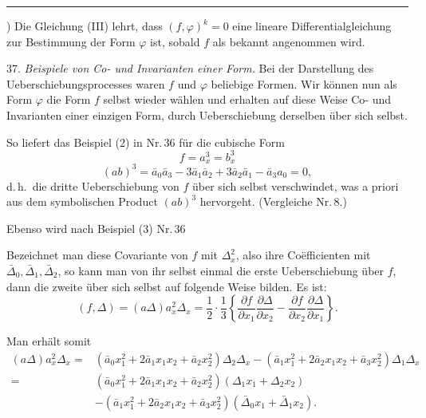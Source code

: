 \noindent\rule{4cm}{0.4pt}

{\footnotesize *) Die Gleichung (III) lehrt, dass $(f, \varphi)^k = 0$ eine lineare
Differentialgleichung zur Bestimmung der Form $\varphi$ ist, sobald $f$ als bekannt
angenommen wird.}



37. \textit{Beispiele von Co- und Invarianten einer Form.} Bei der
Darstellung des Ueberschiebungsprocesses waren $f$ und $\varphi$
beliebige Formen. Wir können nun als Form $\varphi$ die Form $f$
selbst wieder wählen und erhalten auf diese Weise Co- und Invarianten
einer einzigen Form, durch Ueberschiebung derselben über sich selbst.

So liefert das Beispiel (2) in Nr.\,36 für die cubische Form
\[
f=a_x^3=b_x^3
\]
\[
(ab)^3=\bar a_0\bar a_3-3\bar a_1\bar a_2+3\bar a_2\bar a_1-\bar a_3a_0=0,
\]
d.\,h.\ die dritte Ueberschiebung von $f$ über sich selbst verschwindet,
was a priori aus dem symbolischen Product $(ab)^3$ hervorgeht. (Vergleiche
Nr.\,8.)

Ebenso wird nach Beispiel (3) Nr.\,36

Bezeichnet man diese Covariante von $f$ mit $\Delta_x^2$, also ihre
Co\"efficienten mit $\bar\Delta_0, \bar\Delta_1, \bar\Delta_2$, so kann man von
ihr selbst einmal die erste Ueberschiebung über $f$, dann die zweite über
sich selbst auf folgende Weise bilden. Es ist:
\[
(f, \Delta)=(a\Delta)a_x^2\Delta_x=\frac{1}{2}\cdot\frac{1}{3}\left\{\frac{\partial f}{\partial x_1}\frac{\partial \Delta}{\partial x_2} - \frac{\partial f}{\partial x_2}\frac{\partial \Delta}{\partial x_1}\right\}.
\]

Man erhält somit
\[
\begin{aligned}
(a\Delta)a_x^2\Delta_x={}&(\bar a_0x_1^2+2\bar a_1x_1x_2+\bar a_2x_2^2)\Delta_2\Delta_x-(\bar a_1x_1^2+2\bar a_2x_1x_2+\bar a_3x_2^2)\Delta_1\Delta_x\\
={}&(\bar a_0x_1^2+2\bar a_1x_1x_2+\bar a_2x_2^2)(\Delta_1x_1+\Delta_2x_2)\\
&-(\bar a_1x_1^2+2\bar a_2x_1x_2+\bar a_3x_2^2)(\bar\Delta_0x_1+\bar\Delta_1x_2).
\end{aligned}
\]

